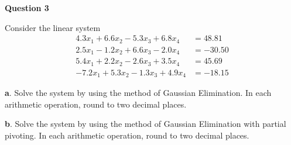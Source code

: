 

\begin{tcolorbox}
\textbf{Question 3} 

Consider the linear system
$$
\begin{aligned}
4.3 x_{1}+6.6 x_{2}-5.3 x_{3}+6.8 x_{4} &=48.81 \\
2.5 x_{1}-1.2 x_{2}+6.6 x_{3}-2.0 x_{4} &=-30.50 \\
5.4 x_{1}+2.2 x_{2}-2.6 x_{3}+3.5 x_{4} &=45.69 \\
-7.2 x_{1}+5.3 x_{2}-1.3 x_{3}+4.9 x_{4} &=-18.15
\end{aligned}
$$


\textbf a. Solve the system by using the method of Gaussian Elimination. In each arithmetic operation, round to two decimal places.



\textbf b. Solve the system by using the method of Gaussian Elimination with partial pivoting. In each arithmetic operation, round to two decimal places.






\end{tcolorbox}

